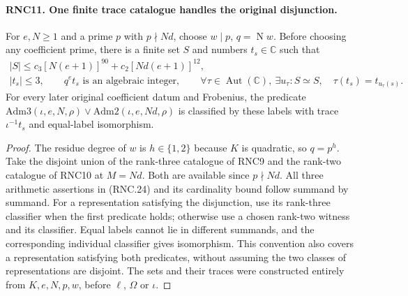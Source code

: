 \documentclass[11pt,a4paper]{article}
\numberwithin{equation}{section}
\theoremstyle{remark}\newtheorem{remark}[theorem]{Remark}
\begin{document}
\paragraph{RNC11. One finite trace catalogue handles the original disjunction.}
\label{claim:RNC11}
For $e,N\geq1$ and a prime $p$ with $p\nmid Nd$, choose
$w\mid p$, $q=\operatorname{N}w$.  Before choosing any
coefficient prime, there is a finite set $S$ and numbers
$t_s\in\mathbb C$ such that
\[
 \begin{gathered}
 |S|\leq c_3[N(e+1)]^{90}
                   +c_2[Nd(e+1)]^{12},\\
 |t_s|\leq3,\qquad q^e t_s\text{ is an algebraic integer},
 \qquad \forall\tau\in\operatorname{Aut}(\mathbb C),\
          \exists u_\tau:S\simeq S,\quad
          \tau(t_s)=t_{u_\tau(s)}.
 \end{gathered}                                                 \tag{RNC.24}
\]
For every later original coefficient datum and Frobenius,
the predicate
$\mathrm{Adm3}(\iota,e,N,\rho)\lor
\mathrm{Adm2}(\iota,e,Nd,\rho)$ is classified by these
labels with trace $\iota^{-1}t_s$ and equal-label
isomorphism.
\begin{proof}
The residue degree of $w$ is $h\in\{1,2\}$ because $K$
is quadratic, so $q=p^h$.  Take the disjoint union of the
rank-three catalogue of RNC9 and the rank-two catalogue
of RNC10 at $M=Nd$.  Both are available since $p\nmid Nd$.
All three arithmetic assertions in (RNC.24) and its
cardinality bound follow summand by summand.  For a
representation satisfying the disjunction, use its
rank-three classifier when the first predicate holds;
otherwise use a chosen rank-two witness and its
classifier.  Equal labels cannot lie in different
summands, and the corresponding individual classifier
gives isomorphism.  This convention also covers a
representation satisfying both predicates, without
assuming the two classes of representations are disjoint.
The sets and their traces were constructed entirely from
$K,e,N,p,w$, before $\ell$, $\Omega$ or $\iota$.
\end{proof}

\end{document}
